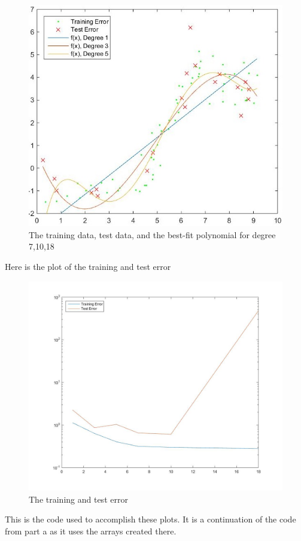\documentclass[twoside,11pt]{article}
\theoremstyle{definition}
\begin{document}
\begin{figure}[h]
\centering
\includegraphics[height=3 in]{prob1cPlotA_1.jpg}
\caption{The training data, test data, and the best-fit polynomial for degree 7,10,18}
\end{figure}

\newpage

Here is the plot of the training and test error
\begin{figure}[h]
\centering
\includegraphics[width=5 in]{prob1cPlotB.jpg}
\caption{The training and test error}
\end{figure}

\newpage

This is the code used to accomplish these plots. It is a continuation of the code from part a as it uses the arrays created there. 

\end{document}

